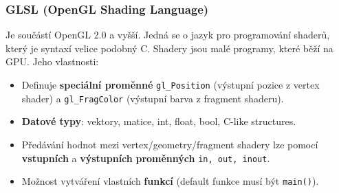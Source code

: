 \subsubsection{GLSL (OpenGL Shading Language)}
Je součástí OpenGL 2.0 a vyšší. Jedná se o jazyk pro programování shaderů, který je syntaxí velice podobný C. Shadery jsou malé programy, které běží na GPU. Jeho vlastnosti:
\begin{itemize}
\item Definuje \textbf{speciální proměnné} \texttt{gl\_Position} (výstupní pozice z vertex shader) a \texttt{gl\_FragColor} (výstupní barva z fragment shaderu).
\item \textbf{Datové typy}: vektory, matice, int, float, bool, C-like structures.
\item Předávání hodnot mezi vertex/geometry/fragment shadery lze pomocí \textbf{vstupních} a \textbf{výstupních} \textbf{proměnných} \texttt{in, out, inout}.
\item Možnost vytváření vlastních \textbf{funkcí} (default funkce musí být \texttt{main()}).
\end{itemize}




